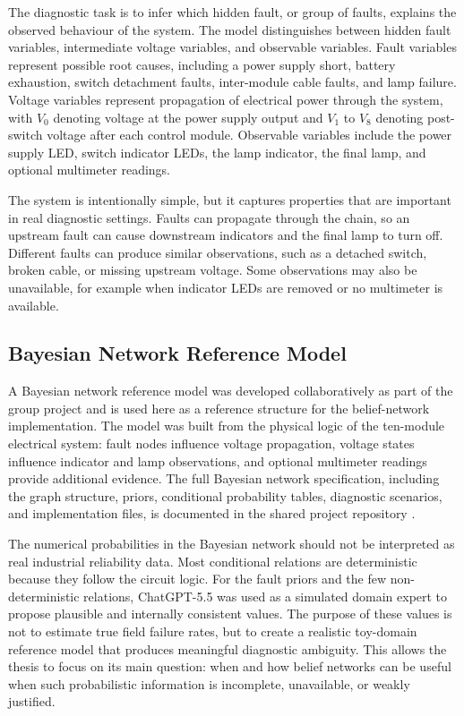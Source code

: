 \documentclass[runningheads]{llncs}
\begin{document}
The diagnostic task is to infer which hidden fault, or group of faults, explains the observed behaviour of the system. The model distinguishes between hidden fault variables, intermediate voltage variables, and observable variables. Fault variables represent possible root causes, including a power supply short, battery exhaustion, switch detachment faults, inter-module cable faults, and lamp failure. Voltage variables represent propagation of electrical power through the system, with $V_0$ denoting voltage at the power supply output and $V_1$ to $V_8$ denoting post-switch voltage after each control module. Observable variables include the power supply LED, switch indicator LEDs, the lamp indicator, the final lamp, and optional multimeter readings.

The system is intentionally simple, but it captures properties that are important in real diagnostic settings. Faults can propagate through the chain, so an upstream fault can cause downstream indicators and the final lamp to turn off. Different faults can produce similar observations, such as a detached switch, broken cable, or missing upstream voltage. Some observations may also be unavailable, for example when indicator LEDs are removed or no multimeter is available.


\subsection{Bayesian Network Reference Model}
\label{sec:bayesian_network_reference_model}

A Bayesian network reference model was developed collaboratively as part of the group project and is used here as a reference structure for the belief-network implementation. The model was built from the physical logic of the ten-module electrical system: fault nodes influence voltage propagation, voltage states influence indicator and lamp observations, and optional multimeter readings provide additional evidence. The full Bayesian network specification, including the graph structure, priors, conditional probability tables, diagnostic scenarios, and implementation files, is documented in the shared project repository \cite{BNRepository2026}.

The numerical probabilities in the Bayesian network should not be interpreted as real industrial reliability data. Most conditional relations are deterministic because they follow the circuit logic. For the fault priors and the few non-deterministic relations, ChatGPT-5.5 was used as a simulated domain expert to propose plausible and internally consistent values. The purpose of these values is not to estimate true field failure rates, but to create a realistic toy-domain reference model that produces meaningful diagnostic ambiguity. This allows the thesis to focus on its main question: when and how belief networks can be useful when such probabilistic information is incomplete, unavailable, or weakly justified.
\end{document}
